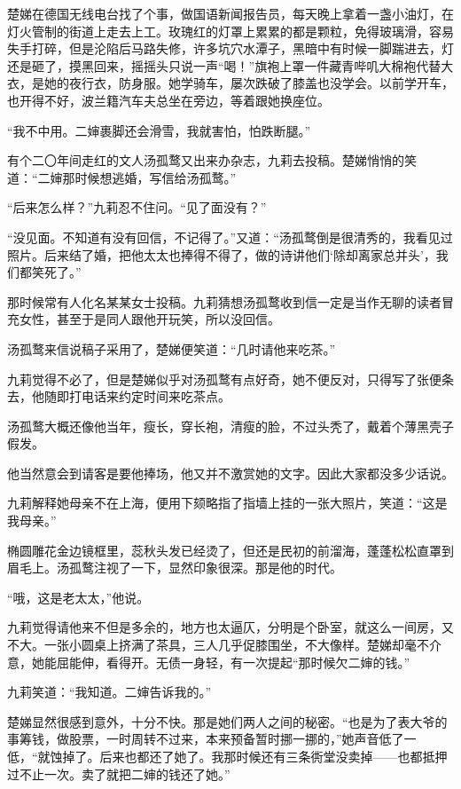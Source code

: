 \par 楚娣在德国无线电台找了个事，做国语新闻报告员，每天晚上拿着一盏小油灯，在灯火管制的街道上走去上工。玫瑰红的灯罩上累累的都是颗粒，免得玻璃滑，容易失手打碎，但是沦陷后马路失修，许多坑穴水潭子，黑暗中有时候一脚踹进去，灯还是砸了，摸黑回来，摇摇头只说一声“喝！”旗袍上罩一件藏青哔叽大棉袍代替大衣，是她的夜行衣，防身服。她学骑车，屡次跌破了膝盖也没学会。以前学开车，也开得不好，波兰籍汽车夫总坐在旁边，等着跟她换座位。
\par “我不中用。二婶裹脚还会滑雪，我就害怕，怕跌断腿。”
\par 有个二〇年间走红的文人汤孤鹜又出来办杂志，九莉去投稿。楚娣悄悄的笑道：“二婶那时候想逃婚，写信给汤孤鹜。”
\par “后来怎么样？”九莉忍不住问。“见了面没有？”
\par “没见面。不知道有没有回信，不记得了。”又道：“汤孤鹜倒是很清秀的，我看见过照片。后来结了婚，把他太太也捧得不得了，做的诗讲他们‘除却离家总并头’，我们都笑死了。”
\par 那时候常有人化名某某女士投稿。九莉猜想汤孤鹜收到信一定是当作无聊的读者冒充女性，甚至于是同人跟他开玩笑，所以没回信。
\par 汤孤鹜来信说稿子采用了，楚娣便笑道：“几时请他来吃茶。”
\par 九莉觉得不必了，但是楚娣似乎对汤孤鹜有点好奇，她不便反对，只得写了张便条去，他随即打电话来约定时间来吃茶点。
\par 汤孤鹜大概还像他当年，瘦长，穿长袍，清瘦的脸，不过头秃了，戴着个薄黑壳子假发。
\par 他当然意会到请客是要他捧场，他又并不激赏她的文字。因此大家都没多少话说。
\par 九莉解释她母亲不在上海，便用下颏略指了指墙上挂的一张大照片，笑道：“这是我母亲。”
\par 椭圆雕花金边镜框里，蕊秋头发已经烫了，但还是民初的前溜海，蓬蓬松松直罩到眉毛上。汤孤鹜注视了一下，显然印象很深。那是他的时代。
\par “哦，这是老太太，”他说。
\par 九莉觉得请他来不但是多余的，地方也太逼仄，分明是个卧室，就这么一间房，又不大。一张小圆桌上挤满了茶具，三人几乎促膝围坐，不大像样。楚娣却毫不介意，她能屈能伸，看得开。无债一身轻，有一次提起“那时候欠二婶的钱。”
\par 九莉笑道：“我知道。二婶告诉我的。”
\par 楚娣显然很感到意外，十分不快。那是她们两人之间的秘密。“也是为了表大爷的事筹钱，做股票，一时周转不过来，本来预备暂时挪一挪的，”她声音低了一低，“就蚀掉了。后来也都还了她了。我那时候还有三条衖堂没卖掉——也都抵押过不止一次。卖了就把二婶的钱还了她。”

